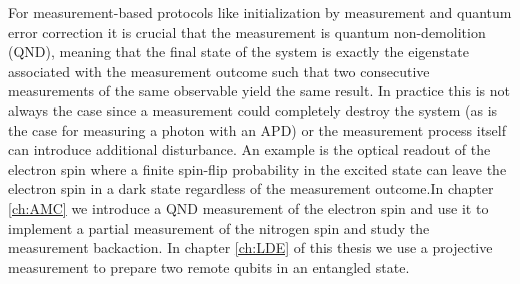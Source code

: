 For measurement-based protocols like initialization by measurement and quantum error correction\cite{Devoret_Science_2013} it is crucial that the measurement is quantum non-demolition (QND)\cite{Braginsky_Science_1980}, meaning that the final state of the system is exactly the eigenstate associated with the measurement outcome such that two consecutive measurements of the same observable yield the same result. In practice this is not always the case since a measurement could completely destroy the system (as is the case for measuring a photon with an APD) or the measurement process itself can introduce additional disturbance. An example is the optical readout of the electron spin where a finite spin-flip probability in the excited state can leave the electron spin in a dark state regardless of the measurement outcome.In chapter \ref{ch:AMC} we introduce a QND measurement of the electron spin and use it to implement a partial measurement of the nitrogen spin and study the measurement backaction. In chapter \ref{ch:LDE} of this thesis we use a projective measurement to prepare two remote qubits in an entangled state.

\newpage





